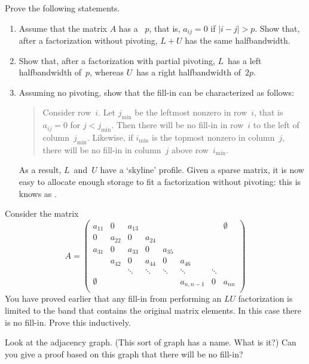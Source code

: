 \begin{exercise}
\label{ex:skyline}
  Prove the following statements.
  \begin{enumerate}
  \item Assume that the matrix $A$ has a
    ~$p$, that is, $a_{ij}=0$ if
    $|i-j|>p$. Show that, after a factorization without pivoting,
    $L+U$ has the same halfbandwidth.
  \item Show that, after a factorization with partial pivoting,
    $L$~has a left halfbandwidth of~$p$, whereas $U$~has a
    right halfbandwidth of~$2p$.
  \item Assuming no pivoting, show that the fill-in can be
    characterized as follows:
    \begin{quote}
      Consider row~$i$. Let $j_{\min}$ be the leftmost nonzero in
      row~$i$, that is $a_{ij}=0$ for $j<j_{\min}$. Then there will be
      no fill-in in row~$i$ to the left of
      column~$j_{\min}$. Likewise, if $i_{\min}$ is the topmost
      nonzero in column~$j$, there will be no fill-in in column~$j$
      above row~$i_{\min}$.
    \end{quote}
    As a result, $L$~and~$U$ have a `skyline' profile. Given a sparse
    matrix, it is now easy to allocate enough storage to fit a
    factorization without pivoting: this is knows as
    .
  \end{enumerate}
\end{exercise}

\begin{exercise}
  \label{ex:fill-uncoupled}
  Consider the matrix
  \[ A=
  \begin{pmatrix}
    a_{11}&0     &a_{13}&      &      &         &      &\emptyset \\
    0     &a_{22}&0     &a_{24}\\
    a_{31}&0     &a_{33}&0     &a_{35}\\
          &a_{42}&0     &a_{44}&0     &a_{46}\\
          &      &\ddots&\ddots&\ddots&\ddots   &\ddots\\
    \emptyset   &&      &      &      &a_{n,n-1}&0     &a_{nn}\\
  \end{pmatrix}
  \]
  You have proved earlier that any fill-in from performing an $LU$
  factorization is limited to the band that contains the original
  matrix elements. In this case there is no fill-in. Prove this inductively.

  Look at the adjacency graph. (This sort of graph has a name. What is it?)
  Can you give a proof based on this graph that there will be no fill-in?
\end{exercise}

